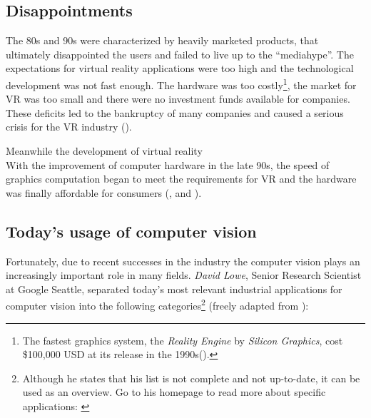 \subsection{Disappointments}
The 80s and 90s were characterized by heavily marketed products, that ultimately disappointed the users and failed to live up to the \enquote{mediahype}. The expectations for virtual reality applications were too high and the technological development was not fast enough. The hardware was too costly\footnote{The fastest graphics system, the \textit{Reality Engine} by \textit{Silicon Graphics}, cost \$100,000 USD at its release in the 1990s(\cite[p.10]{Burdea.2003}).}, the market for VR was too small and there were no investment funds available for companies. These deficits led to the bankruptcy of many companies and caused a serious crisis for the VR industry (\cite[p.10]{Burdea.2003}). 

Meanwhile the development of virtual reality  \\

With the improvement of computer hardware in the late 90s, the speed of graphics computation began to meet the requirements for VR and the hardware was finally affordable for consumers (\cite[p.10 et seq.]{Burdea.2003}, \cite{Doerner.2013} and \cite[p.3]{Toennis.2010}).

\subsection{Today's usage of computer vision}\label{ssec:Today}
Fortunately, due to recent successes in the industry the computer vision plays an increasingly important role in many fields. \textit{David Lowe}, Senior Research Scientist at Google Seattle, separated today's most relevant industrial applications for computer vision into the following categories\footnote{Although he states that his list is not complete and not up-to-date, it can be used as an overview. Go to his homepage to read more about specific applications: \cite{Lowe.2016}} (freely adapted from \cite{Lowe.2016}): 


